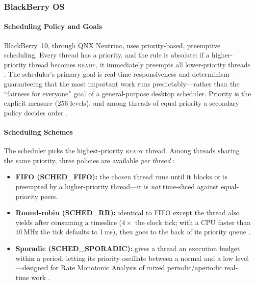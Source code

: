 \subsubsection{BlackBerry OS}

\paragraph{Scheduling Policy and Goals}

BlackBerry~10, through QNX Neutrino, uses priority-based, preemptive
scheduling. Every thread has a priority, and the rule is absolute: if a
higher-priority thread becomes \textsc{ready}, it immediately preempts
all lower-priority threads
\citep{qnx_kernel_sysarch, qnx_sched_policies}. The scheduler's
primary goal is real-time responsiveness and determinism---guaranteeing
that the most important work runs predictably---rather than the
``fairness for everyone'' goal of a general-purpose desktop scheduler.
Priority is the explicit measure (256 levels), and among threads of
equal priority a secondary policy decides order \citep{qnx_kernel_sysarch}.

\paragraph{Scheduling Schemes}

The scheduler picks the highest-priority \textsc{ready} thread. Among
threads sharing the same priority, three policies are available
\emph{per thread} \citep{qnx_kernel_sysarch, qnx_sched_policies}:

\begin{itemize}
\item \textbf{FIFO (SCHED\_FIFO):} the chosen thread runs until it
  blocks or is preempted by a higher-priority thread---it is \emph{not}
  time-sliced against equal-priority peers.
\item \textbf{Round-robin (SCHED\_RR):} identical to FIFO except the
  thread also yields after consuming a timeslice ($4\times$ the clock
  tick; with a CPU faster than 40\,MHz the tick defaults to 1\,ms),
  then goes to the back of its priority queue \citep{qnx_sched_policies}.
\item \textbf{Sporadic (SCHED\_SPORADIC):} gives a thread an execution
  budget within a period, letting its priority oscillate between a
  normal and a low level---designed for Rate Monotonic Analysis of
  mixed periodic/aperiodic real-time work \citep{qnx_kernel_sysarch,
  qnx_sched_policies}.
\end{itemize}

